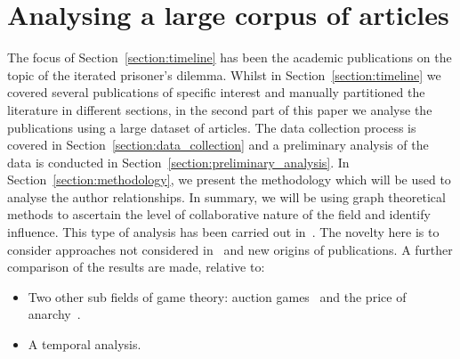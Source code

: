 \documentclass{article}
\theoremstyle{definition}
\begin{document}


\section{Analysing a large corpus of articles}\label{section:analysis}

The focus of Section~\ref{section:timeline} has been the academic publications on the topic of the iterated
prisoner's dilemma. Whilst in Section~\ref{section:timeline} we covered
several publications of specific interest and manually partitioned the literature
in different sections, in the second part of this paper we analyse the publications
using a large dataset of articles. The data collection process is covered in
Section~\ref{section:data_collection} and a preliminary analysis of the data is
conducted in Section~\ref{section:preliminary_analysis}. In Section~\ref{section:methodology},
we present the methodology which will be used to analyse the author relationships.
In summary, we will be using graph theoretical methods to ascertain the level of
collaborative nature of the field and identify influence.
This type of analysis has been carried out in~\cite{Liu2015}. The novelty here
is to consider approaches not considered in~\cite{Liu2015} and new origins of
publications. A further comparison of the results are made, relative to:

\begin{itemize}
    \item Two other sub fields of game theory: auction games~\cite{menezes2005} and 
    the price of anarchy~\cite{roughgarden2005}.
    \item A temporal analysis.
\end{itemize}
\end{document}
